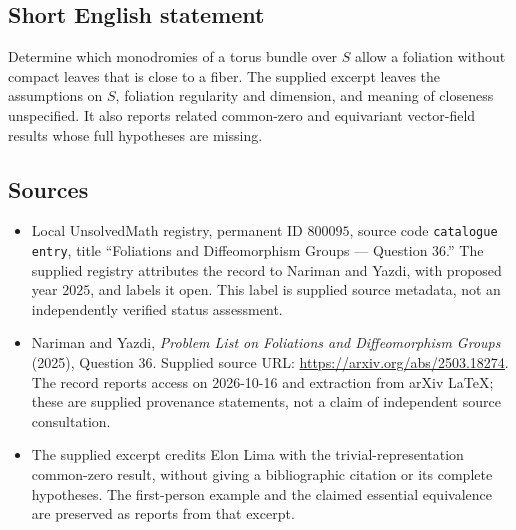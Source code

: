 \documentclass[11pt]{article}
\begin{document}
\subsection{Short English statement}
Determine which monodromies of a torus bundle over \(S\) allow a foliation without compact leaves that is close to a fiber. The supplied excerpt leaves the assumptions on \(S\), foliation regularity and dimension, and meaning of closeness unspecified. It also reports related common-zero and equivariant vector-field results whose full hypotheses are missing.
\subsection{Sources}
\begin{itemize}
\item Local UnsolvedMath registry, permanent ID \(800095\), source code \texttt{catalogue entry}, title ``Foliations and Diffeomorphism Groups --- Question 36.'' The supplied registry attributes the record to Nariman and Yazdi, with proposed year \(2025\), and labels it open. This label is supplied source metadata, not an independently verified status assessment.
\item Nariman and Yazdi, \emph{Problem List on Foliations and Diffeomorphism Groups} (2025), Question 36. Supplied source URL: \url{https://arxiv.org/abs/2503.18274}. The record reports access on 2026-10-16 and extraction from arXiv LaTeX; these are supplied provenance statements, not a claim of independent source consultation.
\item The supplied excerpt credits Elon Lima with the trivial-representation common-zero result, without giving a bibliographic citation or its complete hypotheses. The first-person example and the claimed essential equivalence are preserved as reports from that excerpt.
\end{itemize}
\end{document}
